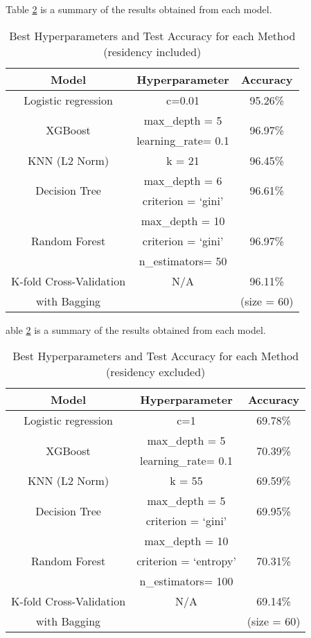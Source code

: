 Table \ref{results} is a summary of the results obtained from each model. 
	\begin{table}[H]
		\begin{tabular}{|c|c|c|}
			\hline
			Model & Hyperparameter & Accuracy\\
			\hline 
			\hline
			Logistic regression & c=0.01 & 95.26\%\\
			\hline
			\multirow{2}{*}{XGBoost}  & \small{max\_depth = 5} & \multirow{2}{*}{96.97\%}\\
			& \small{learning\_rate= 0.1} & \\
			\hline
			KNN (L2 Norm) & k = 21 & 96.45\%\\
			\hline
			\multirow{2}{*}{Decision Tree}  & \small{max\_depth = 6} & \multirow{2}{*}{96.61\%}\\
			& \small{criterion = ‘gini’} & \\
			\hline
			\multirow{3}{*}{Random Forest} & \small{max\_depth = 10} & \multirow{3}{*}{96.97\%}\\
			& \small{criterion = ‘gini’}& \\
			& \small{n\_estimators= 50}& \\
			\hline
			K-fold Cross-Validation & N/A & 96.11\% \\
			with Bagging & & (size = 60)\\
			\hline		
		\end{tabular}
		\caption{Best Hyperparameters and Test Accuracy for each Method (residency included)}\label{results}
	\end{table}



able \ref{results} is a summary of the results obtained from each model. 
	\begin{table}[H]
		\begin{tabular}{|c|c|c|}
			\hline
			Model & Hyperparameter & Accuracy\\
			\hline 
			\hline
			Logistic regression & c=1 & 69.78\%\\
			\hline
			\multirow{2}{*}{XGBoost}  & \small{max\_depth = 5} & \multirow{2}{*}{70.39\%}\\
			& \small{learning\_rate= 0.1} & \\
			\hline
			KNN (L2 Norm) & k = 55 & 69.59\%\\
			\hline
			\multirow{2}{*}{Decision Tree}  & \small{max\_depth = 5} & \multirow{2}{*}{69.95\%}\\
			& \small{criterion = ‘gini’} & \\
			\hline
			\multirow{3}{*}{Random Forest} & \small{max\_depth = 10} & \multirow{3}{*}{70.31\%}\\
			& \small{criterion = ‘entropy’}& \\
			& \small{n\_estimators= 100}& \\
			\hline
			K-fold Cross-Validation & N/A & 69.14\% \\
			with Bagging & & (size = 60)\\
			\hline		
		\end{tabular}
		\caption{Best Hyperparameters and Test Accuracy for each Method (residency excluded)}\label{results}
	\end{table}
